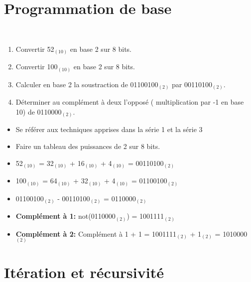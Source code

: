 \section{Programmation de base}

\begin{Exercice}[10 minutes]\\
    \begin{enumerate}
        \item Convertir 52$_{(10)}$ en base 2 sur 8 bits.
        \item Convertir 100$_{(10)}$ en base 2 sur 8 bits.
        \item Calculer en base 2 la soustraction de 01100100$_{(2)}$ par 00110100$_{(2)}$.
        \item Déterminer au complément à deux l'opposé ( multiplication par -1 en base 10) de 0110000$_{(2)}$.
    \end{enumerate}
\begin{conseil}
   \begin{itemize}
       \item Se référer aux techniques apprises dans la série 1 et la série 3
       \item Faire un tableau des puissances de 2 sur 8 bits.
   \end{itemize}
\end{conseil}
    
\begin{solution}
\begin{itemize}
    \item 52$_{(10)}$ = 32$_{(10)}$ + 16$_{(10)}$ + 4$_{(10)}$ = 00110100$_{(2)}$
    \item 100$_{(10)}$ = 64$_{(10)}$ + 32$_{(10)}$ + 4$_{(10)}$ = 01100100$_{(2)}$
    \item 01100100$_{(2)}$ - 00110100$_{(2)}$ = 0110000$_{(2)}$
    \item \textbf{Complément à 1:} not(0110000$_{(2)}$) = 1001111$_{(2)}$ 
    \item \textbf{Complément à 2:} Complément à 1 + 1 = 1001111$_{(2)}$ + 1$_{(2)}$ = 1010000$_{(2)}$
\end{itemize}   
\end{solution}

\end{Exercice}



\section{Itération et récursivité}

